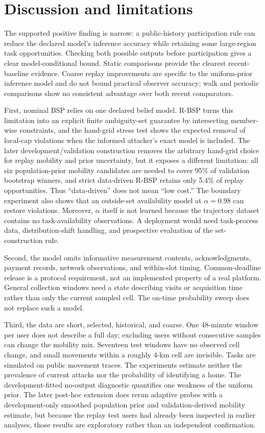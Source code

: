 \documentclass[review,12pt]{elsarticle}
\begin{document}
\section{Discussion and limitations}
The supported positive finding is narrow: a public-history participation rule can reduce the declared model's inference accuracy while retaining some large-region task opportunities. Checking both possible outputs before participation gives a clear model-conditional bound. Static comparisons provide the clearest recent-baseline evidence. Coarse replay improvements are specific to the uniform-prior inference model and do not bound practical observer accuracy; walk and periodic comparisons show no consistent advantage over both recent comparators.

First, nominal BSP relies on one declared belief model. R-BSP turns this limitation into an explicit finite ambiguity-set guarantee by intersecting member-wise constraints, and the hand-grid stress test shows the expected removal of local-cap violations when the informed attacker's exact model is included. The later development/validation construction removes the arbitrary hand-grid choice for replay mobility and prior uncertainty, but it exposes a different limitation: all six population-prior mobility candidates are needed to cover 95\% of validation bootstrap winners, and strict data-driven R-BSP retains only 5.4\% of replay opportunities. Thus ``data-driven'' does not mean ``low cost.'' The boundary experiment also shows that an outside-set availability model at $\alpha=0.98$ can restore violations. Moreover, $\alpha$ itself is not learned because the trajectory dataset contains no task-availability observations. A deployment would need task-process data, distribution-shift handling, and prospective evaluation of the set-construction rule.

Second, the model omits informative measurement contents, acknowledgments, payment records, network observations, and within-slot timing. Common-deadline release is a protocol requirement, not an implemented property of a real platform. General collection windows need a state describing visits or acquisition time rather than only the current sampled cell. The on-time probability sweep does not replace such a model.

Third, the data are short, selected, historical, and coarse. One 48-minute window per user does not describe a full day; excluding users without consecutive samples can change the mobility mix. Seventeen test windows have no observed cell change, and small movements within a roughly 4-km cell are invisible. Tasks are simulated on public movement traces. The experiments estimate neither the prevalence of current attacks nor the probability of identifying a home. The development-fitted no-output diagnostic quantifies one weakness of the uniform prior. The later post-hoc extension does rerun adaptive probes with a development-only smoothed population prior and validation-derived mobility estimate, but because the replay test users had already been inspected in earlier analyses, those results are exploratory rather than an independent confirmation.
\end{document}
